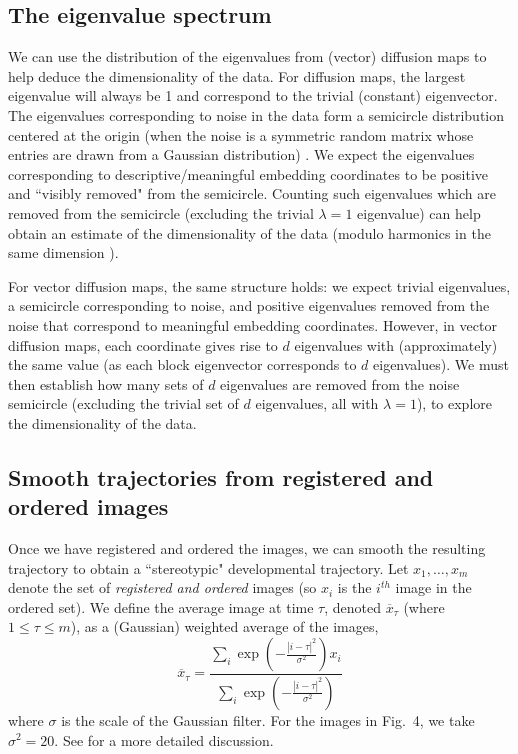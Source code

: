 \documentclass{pnastwo}
\newcommand{\fig}[0]{Fig.}
\begin{document}
\begin{article}
\subsection{The eigenvalue spectrum}

We can use the distribution of the eigenvalues from (vector) diffusion maps to help deduce the dimensionality of the data.
%
For diffusion maps, the largest eigenvalue will always be 1 and correspond to the trivial (constant) eigenvector.
%
The eigenvalues corresponding to noise in the data form a semicircle distribution centered at the origin (when the noise is a symmetric random matrix whose entries are drawn from a Gaussian distribution) \cite{wigner1955characteristic, wigner1958distribution}.
%
We expect the eigenvalues corresponding to descriptive/meaningful embedding coordinates to be positive and ``visibly removed" from the semicircle.
%
Counting such eigenvalues which are removed from the semicircle (excluding the trivial $\lambda=1$ eigenvalue) can help obtain an estimate of the dimensionality of the data (modulo harmonics in the same dimension \cite{ferguson2010systematic}).

For vector diffusion maps, the same structure holds: we expect trivial eigenvalues, a semicircle corresponding to noise, and positive eigenvalues removed from the noise that correspond to meaningful embedding coordinates.
%
However, in vector diffusion maps, each coordinate gives rise to $d$ eigenvalues with (approximately) the same value (as each block eigenvector corresponds to $d$ eigenvalues).
%
We must then establish how many sets of $d$ eigenvalues are removed from the noise semicircle (excluding the trivial set of $d$ eigenvalues, all with  $\lambda=1$), to explore the dimensionality of the data.

\subsection{Smooth trajectories from registered and ordered images}

Once we have registered and ordered the images, we can smooth the resulting trajectory to obtain a ``stereotypic" developmental trajectory.
%
Let $x_1, \dots, x_m$ denote the set of {\em registered and ordered} images (so $x_i$ is the $i^{th}$ image in the ordered set).
%
We define the average image at time $\tau$, denoted $\overline{x}_{\tau}$ (where $1 \le \tau \le m$), as a (Gaussian) weighted average of the images,
\begin{equation}
\overline{x}_{\tau} =  \frac{\sum_i \exp \left( - \frac{|i - \tau|^2}{\sigma^2} \right) x_i}{\sum_i \exp \left( - \frac{|i - \tau|^2}{\sigma^2} \right) }
\end{equation}
where $\sigma$ is the scale of the Gaussian filter.
%
For the images in \fig~4, we take $\sigma^2 = 20$.
%
See \cite{kemelmacher2011exploring} for a more detailed discussion.






\end{article}
\end{document}
